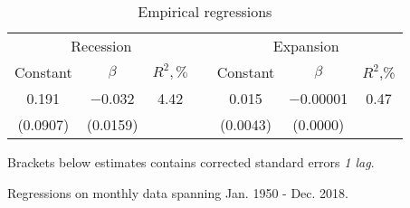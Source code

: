 \begin{table}[H]
 \centering
   \caption{Empirical regressions}           
   \label{tab:regressEmp}
 \begin{threeparttable}
 \begin{tabular}{@{}ccccccc@{}}
 \toprule
   \multicolumn{3}{c}{Recession} && \multicolumn{3}{c}{Expansion} \\ 
 \addlinespace
 Constant  & $\beta$  &  $R^2,\%$     && Constant & $\beta$   &  $R^2$,\%      \\
 \cmidrule(lr){1-3} \cmidrule(lr){5-7}
 0.191  & $-$0.032 & 4.42             && 0.015    & $-$0.00001  & 0.47           \\ 
 \addlinespace
 (0.0907)  & (0.0159) &               && (0.0043) & (0.0000)  &                \\
 \bottomrule
 \end{tabular}
 \begin{tablenotes}\footnotesize{
 \item[1] Brackets below estimates contains \citet{NW87} corrected standard errors \textit{1 lag}. 
 \item[2] Regressions on monthly data spanning Jan. 1950 - Dec. 2018.
 }
 \end{tablenotes}
 \end{threeparttable}
 \end{table}